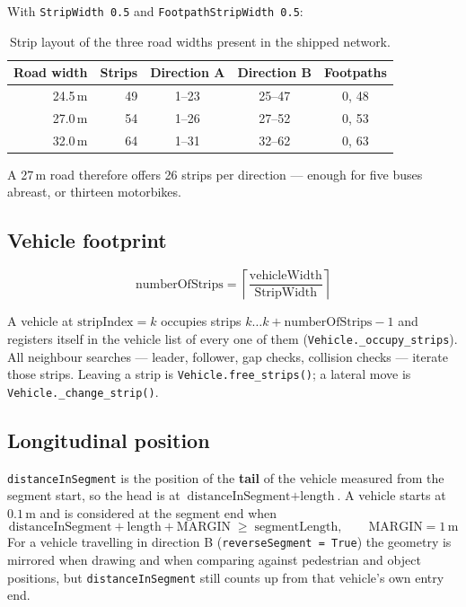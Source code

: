 \documentclass[11pt, a4paper]{article}
\newcommand{\code}[1]{\texttt{#1}}
\begin{document}
With \code{StripWidth 0.5} and \code{FootpathStripWidth 0.5}:

\begin{table}[h!]
\centering
\begin{tabular}{r r c c c}
\toprule
\textbf{Road width} & \textbf{Strips} & \textbf{Direction A} & \textbf{Direction B} & \textbf{Footpaths} \\
\midrule
24.5\,m & 49 & 1--23 & 25--47 & 0, 48 \\
27.0\,m & 54 & 1--26 & 27--52 & 0, 53 \\
32.0\,m & 64 & 1--31 & 32--62 & 0, 63 \\
\bottomrule
\end{tabular}
\caption{Strip layout of the three road widths present in the shipped network.}
\end{table}

A 27\,m road therefore offers 26 strips per direction --- enough for five buses
abreast, or thirteen motorbikes.

\subsection{Vehicle footprint}

\[
    \text{numberOfStrips} = \left\lceil
        \frac{\text{vehicleWidth}}{\text{StripWidth}} \right\rceil
\]

A vehicle at $\text{stripIndex}=k$ occupies strips
$k \dots k+\text{numberOfStrips}-1$ and registers itself in the vehicle list of
every one of them (\code{Vehicle.\_occupy\_strips}). All neighbour searches ---
leader, follower, gap checks, collision checks --- iterate those strips. Leaving
a strip is \code{Vehicle.free\_strips()}; a lateral move is
\code{Vehicle.\_change\_strip()}.

\subsection{Longitudinal position}

\code{distanceInSegment} is the position of the \textbf{tail} of the vehicle
measured from the segment start, so the head is at
$\text{distanceInSegment} + \text{length}$. A vehicle starts at $0.1$\,m and is
considered at the segment end when
\[
    \text{distanceInSegment} + \text{length} + \text{MARGIN}
    \;\geq\; \text{segmentLength}, \qquad \text{MARGIN} = 1\,\text{m}
\]
For a vehicle travelling in direction B (\code{reverseSegment = True}) the
geometry is mirrored when drawing and when comparing against pedestrian and
object positions, but \code{distanceInSegment} still counts up from that
vehicle's own entry end.
\end{document}
